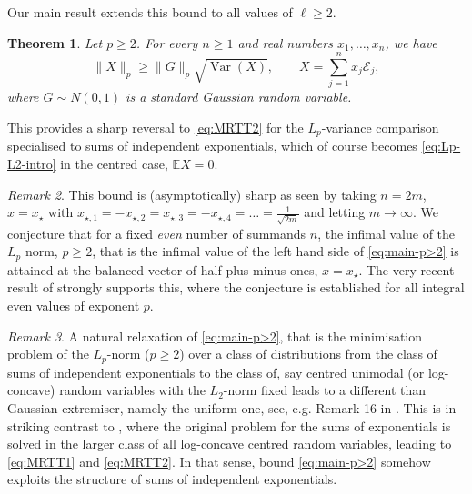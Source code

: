 \documentclass[10pt]{article}
\newcommand{\E}{\mathbb{E}}
\newcommand{\1}{\textbf{1}}
\newcommand{\cE}{\mathscr{E}}
\DeclareMathOperator{\Var}{Var}
\newtheorem{theorem}{Theorem}
\theoremstyle{remark}
\newtheorem{remark}[theorem]{Remark}
\theoremstyle{definition}
\begin{document}
Our main result extends this bound to all values of $\ell \geq 2$.

\begin{theorem}\label{thm:p>2}
Let $p \geq 2$. For every $n \geq 1$ and real numbers $x_1, \dots, x_n$, we have
\begin{equation}\label{eq:main-p>2}
\|X\|_p \geq \|G\|_p\sqrt{\Var(X)}, \qquad X = \sum_{j=1}^n x_j\cE_j,
\end{equation}
where $G \sim N(0,1)$ is a standard Gaussian random variable.
\end{theorem}

This provides a sharp reversal to \eqref{eq:MRTT2} for the $L_p$-variance comparison specialised to sums of independent exponentials, which of course becomes \eqref{eq:Lp-L2-intro} in the centred case, $\E X = 0$.

\begin{remark}\label{rem:conj-fixed-n}
This bound is (asymptotically) sharp as seen by taking $n = 2m$, $x = x_\star$ with $x_{\star, 1} = -x_{\star, 2} = x_{\star, 3} = -x_{\star, 4} = \dots = \frac{1}{\sqrt{2m}}$ and letting $m \to \infty$. We conjecture that  for a fixed \emph{even} number of summands $n$, the infimal value of the $L_p$ norm, $p \geq 2$, that is the infimal value of the left hand side of \eqref{eq:main-p>2} is attained at the balanced vector of half plus-minus ones, $x =  x_\star$. The very recent result of \cite{BP} strongly supports this, where the conjecture is established for all integral even values of exponent $p$.
\end{remark}

\begin{remark}\label{rem:relax}
A natural relaxation of \eqref{eq:main-p>2}, that is the minimisation problem of  the $L_p$-norm ($p \geq 2$) over a class of distributions from the class of sums of independent exponentials to the class of, say centred unimodal (or log-concave) random variables with the $L_2$-norm fixed leads to a different than Gaussian extremiser, namely the uniform one, see, e.g. Remark 16 in \cite{ENT2}. This is in striking contrast to \cite{MRTT}, where the original problem for the sums of exponentials is solved in the larger class of all log-concave centred random variables, leading to \eqref{eq:MRTT1} and \eqref{eq:MRTT2}. In that sense, bound \eqref{eq:main-p>2} somehow exploits the structure of sums of independent exponentials. 
\end{remark}
\end{document}
